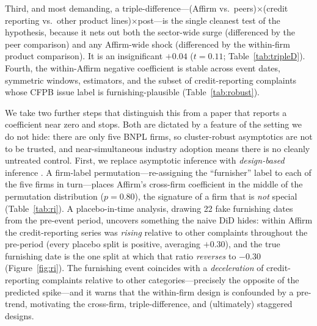 \documentclass[12pt]{article}
\begin{document}
Third, and most demanding, a triple-difference---(Affirm vs.\ peers)$\times$(credit reporting
vs.\ other product lines)$\times$post---is the single cleanest test of the hypothesis, because
it nets out both the sector-wide surge (differenced by the peer comparison) and any Affirm-wide
shock (differenced by the within-firm product comparison). It is an insignificant $+0.04$
($t=0.11$; Table~\ref{tab:tripleD}). Fourth, the within-Affirm negative coefficient is stable
across event dates, symmetric windows, estimators, and the subset of credit-reporting
complaints whose CFPB issue label is furnishing-plausible (Table~\ref{tab:robust}).

We take two further steps that distinguish this from a paper that reports a coefficient near
zero and stops. Both are dictated by a feature of the setting we do not hide: there are only
five BNPL firms, so cluster-robust asymptotics are not to be trusted, and near-simultaneous
industry adoption means there is no cleanly untreated control. First, we replace asymptotic
inference with \emph{design-based} inference \citep{cameron2008,mackinnon2017,conley2011,young2019}.
A firm-label permutation---re-assigning the ``furnisher'' label to each of the five firms in
turn---places Affirm's cross-firm coefficient in the middle of the permutation distribution
($p=0.80$), the signature of a firm that is \emph{not} special (Table~\ref{tab:ri}). A
placebo-in-time analysis, drawing 22 fake furnishing dates from the pre-event period, uncovers
something the naive DiD hides: within Affirm the credit-reporting series was \emph{rising}
relative to other complaints throughout the pre-period (every placebo split is positive,
averaging $+0.30$), and the true furnishing date is the one split at which that ratio
\emph{reverses} to $-0.30$ (Figure~\ref{fig:ri}). The furnishing event coincides with a
\emph{deceleration} of credit-reporting complaints relative to other categories---precisely the
opposite of the predicted spike---and it warns that the within-firm design is confounded by a
pre-trend, motivating the cross-firm, triple-difference, and (ultimately) staggered designs.
\end{document}
